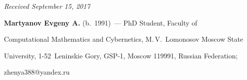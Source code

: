 \vspace*{-3pt}





\hfill{\small\textit{Received September 15, 2017}}


    


    


    \Contrl


    


    \noindent


\textbf{Martyanov Evgeny A.} (b.\ 1991)~--- PhD Student, Faculty of 


Computational Mathematics and Cybernetics, M.\,V.~Lomonosov Moscow State 


University, 1-52~Leninskie Gory, GSP-1, Moscow 119991, Russian Federation; 


\mbox{zhenya388@yandex.ru}


    


\label{end\stat}








\renewcommand{\bibname}{\protect\rm Литература}


